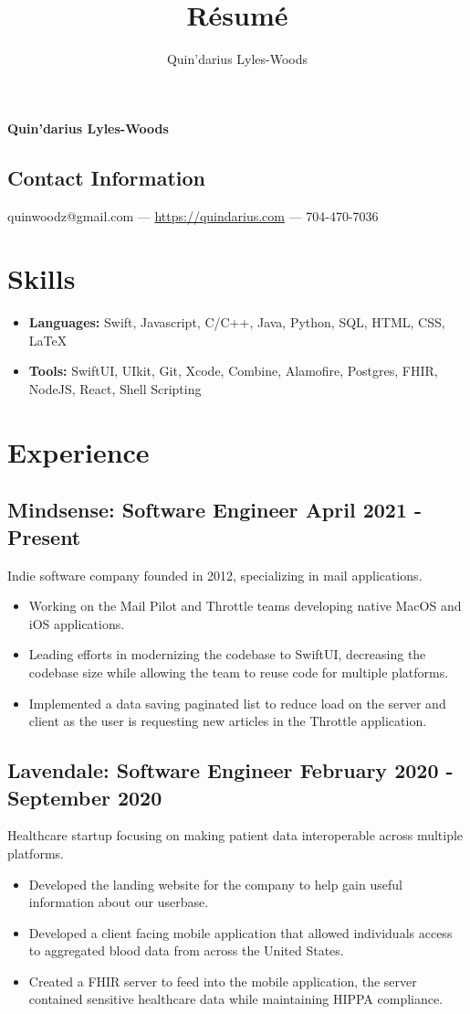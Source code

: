 \documentclass{article}
\makeatletter
\renewcommand{\maketitle}
{
\begin{center}
{\huge\bfseries
Quin'darius Lyles-Woods
}
\end{center}
\vspace{.25em}
\subsection{Contact Information}
quinwoodz@gmail.com --- \url{https://quindarius.com} --- 704-470-7036
}
\makeatother
\begin{document}
\title{R\'esum\'e}
\author{Quin'darius Lyles-Woods}
\maketitle
\thispagestyle{empty}
\section{Skills}
\begin{itemize}
	\item \textbf{Languages: } Swift, Javascript, C/C++, Java, Python, SQL, HTML, CSS, \LaTeX
	\item \textbf{Tools: } SwiftUI, UIkit, Git, Xcode, Combine, Alamofire, Postgres, FHIR, NodeJS, React, Shell Scripting
\end{itemize}
\section{Experience}
\subsection{\large{Mindsense}: Software Engineer \hfill \small{April 2021 - Present}}
Indie software company founded in 2012, specializing in mail applications.
\begin{itemize}
\setlength\itemsep{.1em}
	\item Working on the Mail Pilot and Throttle teams developing native MacOS and iOS applications.
	\item Leading efforts in modernizing the codebase to SwiftUI, decreasing the codebase size while allowing the team to reuse code for multiple platforms. 
	\item Implemented a data saving paginated list to reduce load on the server and client as the user is requesting new articles in the Throttle application. 
\end{itemize}
\subsection{\large{Lavendale}: Software Engineer \hfill \small{February 2020 - September 2020}}
Healthcare startup focusing on making patient data interoperable across multiple platforms.
\begin{itemize}
\setlength\itemsep{.1em}
	\item  Developed  the landing website for the company to help gain useful information about our userbase. 
	\item Developed a client facing mobile application that allowed individuals access to aggregated blood data from across the United States. 
	\item Created a FHIR server to feed into the mobile application, the server contained sensitive healthcare data while maintaining HIPPA compliance.
\end{itemize}
\end{document}
